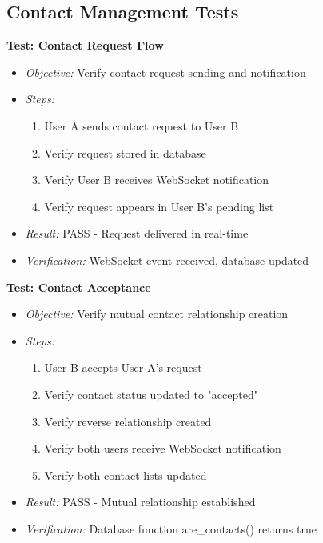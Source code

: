 \subsection{Contact Management Tests}

\textbf{Test: Contact Request Flow}
\begin{itemize}
    \item \textit{Objective:} Verify contact request sending and notification
    \item \textit{Steps:}
    \begin{enumerate}
        \item User A sends contact request to User B
        \item Verify request stored in database
        \item Verify User B receives WebSocket notification
        \item Verify request appears in User B's pending list
    \end{enumerate}
    \item \textit{Result:} PASS - Request delivered in real-time
    \item \textit{Verification:} WebSocket event received, database updated
\end{itemize}

\textbf{Test: Contact Acceptance}
\begin{itemize}
    \item \textit{Objective:} Verify mutual contact relationship creation
    \item \textit{Steps:}
    \begin{enumerate}
        \item User B accepts User A's request
        \item Verify contact status updated to "accepted"
        \item Verify reverse relationship created
        \item Verify both users receive WebSocket notification
        \item Verify both contact lists updated
    \end{enumerate}
    \item \textit{Result:} PASS - Mutual relationship established
    \item \textit{Verification:} Database function are\_contacts() returns true
\end{itemize}

